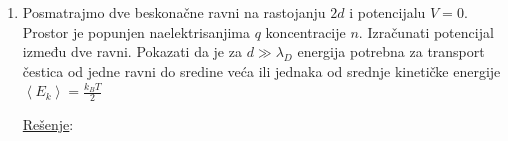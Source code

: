 \documentclass[fleqn]{report}
\begin{document}
\begin{enumerate}
          Za pozitivne vrednosti $V_s$ sonda privlači elektrone, tako da će jako brzo potrošiti sve elektrone na raspolaganju u svojoj brzini, pa će struja kroz nju biti ograničena brzinom generisanja ili dovođenja novih elektrona.
          Na grafiku se ovaj efekat vidi kao zasićenje krive za vrednosti $V > V_p$, dok se u okolini $V = V_p$ javlja koleno, pa se iz pozicije kolena može odrediti i $V_p$.

          \noindent\hfill
          \hfill\null\\

          \hrulefill
    \item Posmatrajmo dve beskonačne ravni na rastojanju $2d$ i potencijalu $V = 0$.
          Prostor je popunjen naelektrisanjima $q$ koncentracije $n$.
          Izračunati potencijal između dve ravni.
          Pokazati da je za $d \gg \lambda_D$ energija potrebna za transport čestica od jedne ravni do sredine veća ili jednaka od srednje kinetičke energije $\left<E_k\right> = \frac{k_B T}{2}$

          \underline{Rešenje}:


\end{enumerate}
\end{document}
